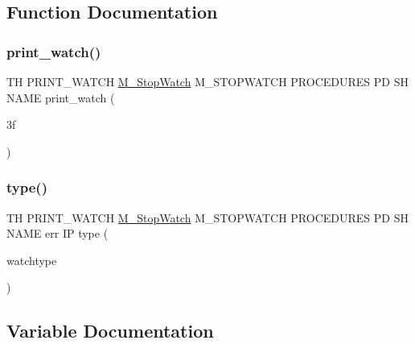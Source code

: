 \subsection{Function Documentation}
\mbox{\label{print__watch_83_8txt_a8615f1e2afa77ade01fc099f7805625e}} 
\subsubsection{\texorpdfstring{print\+\_\+watch()}{print\_watch()}}
{\footnotesize\ttfamily TH P\+R\+I\+N\+T\+\_\+\+W\+A\+T\+CH \hyperlink{option__stopwatch_83_8txt_aa2011fc45a5e502e87ee50996a8a9305}{M\+\_\+\+Stop\+Watch} M\+\_\+\+S\+T\+O\+P\+W\+A\+T\+CH P\+R\+O\+C\+E\+D\+U\+R\+ES PD SH N\+A\+ME print\+\_\+watch (\begin{DoxyParamCaption}\item[{3f}]{ }\end{DoxyParamCaption})}

\mbox{\label{print__watch_83_8txt_abac438c111a8b03ed5b72e0e49efe1c0}} 
\subsubsection{\texorpdfstring{type()}{type()}}
{\footnotesize\ttfamily TH P\+R\+I\+N\+T\+\_\+\+W\+A\+T\+CH \hyperlink{option__stopwatch_83_8txt_aa2011fc45a5e502e87ee50996a8a9305}{M\+\_\+\+Stop\+Watch} M\+\_\+\+S\+T\+O\+P\+W\+A\+T\+CH P\+R\+O\+C\+E\+D\+U\+R\+ES PD SH N\+A\+ME err IP type (\begin{DoxyParamCaption}\item[{watchtype}]{ }\end{DoxyParamCaption})}



\subsection{Variable Documentation}
\mbox{\label{print__watch_83_8txt_a6b008a5efeabe5de2785214b5e3ba69d}} 
